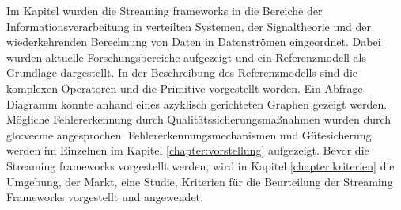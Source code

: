 Im Kapitel  wurden die Streaming frameworks in die Bereiche der Informationsverarbeitung in verteilten Systemen, der Signaltheorie und der wiederkehrenden Berechnung von Daten in Datenströmen eingeordnet. Dabei wurden aktuelle Forschungsbereiche aufgezeigt und ein Referenzmodell als Grundlage dargestellt. In der Beschreibung des Referenzmodells sind die komplexen Operatoren und die Primitive vorgestellt worden. Ein Abfrage-Diagramm konnte anhand eines azyklisch gerichteten Graphen gezeigt werden. Mögliche Fehlererkennung durch Qualitätssicherungsmaßnahmen wurden durch \acrlong{glo:vecme} angesprochen. Fehlererkennungsmechanismen und Gütesicherung werden im Einzelnen im Kapitel \ref{chapter:vorstellung} aufgezeigt. Bevor die Streaming frameworks vorgestellt werden, wird in Kapitel \ref{chapter:kriterien} die Umgebung, der Markt, eine Studie, Kriterien für die Beurteilung der Streaming Frameworks vorgestellt und angewendet.